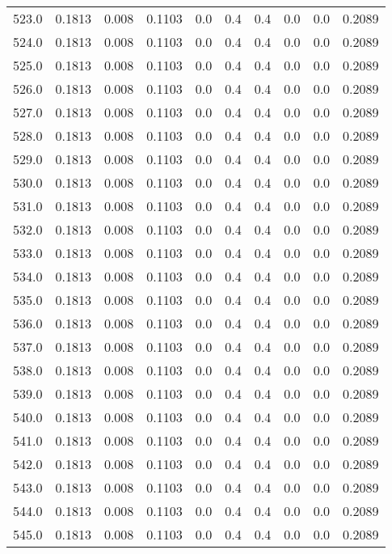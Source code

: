 \begin{longtable}{lrrrrrrrrr}
523.0 & 0.1813 & 0.008 & 0.1103 & 0.0 & 0.4 & 0.4 & 0.0 & 0.0 & 0.2089 \\
524.0 & 0.1813 & 0.008 & 0.1103 & 0.0 & 0.4 & 0.4 & 0.0 & 0.0 & 0.2089 \\
525.0 & 0.1813 & 0.008 & 0.1103 & 0.0 & 0.4 & 0.4 & 0.0 & 0.0 & 0.2089 \\
526.0 & 0.1813 & 0.008 & 0.1103 & 0.0 & 0.4 & 0.4 & 0.0 & 0.0 & 0.2089 \\
527.0 & 0.1813 & 0.008 & 0.1103 & 0.0 & 0.4 & 0.4 & 0.0 & 0.0 & 0.2089 \\
528.0 & 0.1813 & 0.008 & 0.1103 & 0.0 & 0.4 & 0.4 & 0.0 & 0.0 & 0.2089 \\
529.0 & 0.1813 & 0.008 & 0.1103 & 0.0 & 0.4 & 0.4 & 0.0 & 0.0 & 0.2089 \\
530.0 & 0.1813 & 0.008 & 0.1103 & 0.0 & 0.4 & 0.4 & 0.0 & 0.0 & 0.2089 \\
531.0 & 0.1813 & 0.008 & 0.1103 & 0.0 & 0.4 & 0.4 & 0.0 & 0.0 & 0.2089 \\
532.0 & 0.1813 & 0.008 & 0.1103 & 0.0 & 0.4 & 0.4 & 0.0 & 0.0 & 0.2089 \\
533.0 & 0.1813 & 0.008 & 0.1103 & 0.0 & 0.4 & 0.4 & 0.0 & 0.0 & 0.2089 \\
534.0 & 0.1813 & 0.008 & 0.1103 & 0.0 & 0.4 & 0.4 & 0.0 & 0.0 & 0.2089 \\
535.0 & 0.1813 & 0.008 & 0.1103 & 0.0 & 0.4 & 0.4 & 0.0 & 0.0 & 0.2089 \\
536.0 & 0.1813 & 0.008 & 0.1103 & 0.0 & 0.4 & 0.4 & 0.0 & 0.0 & 0.2089 \\
537.0 & 0.1813 & 0.008 & 0.1103 & 0.0 & 0.4 & 0.4 & 0.0 & 0.0 & 0.2089 \\
538.0 & 0.1813 & 0.008 & 0.1103 & 0.0 & 0.4 & 0.4 & 0.0 & 0.0 & 0.2089 \\
539.0 & 0.1813 & 0.008 & 0.1103 & 0.0 & 0.4 & 0.4 & 0.0 & 0.0 & 0.2089 \\
540.0 & 0.1813 & 0.008 & 0.1103 & 0.0 & 0.4 & 0.4 & 0.0 & 0.0 & 0.2089 \\
541.0 & 0.1813 & 0.008 & 0.1103 & 0.0 & 0.4 & 0.4 & 0.0 & 0.0 & 0.2089 \\
542.0 & 0.1813 & 0.008 & 0.1103 & 0.0 & 0.4 & 0.4 & 0.0 & 0.0 & 0.2089 \\
543.0 & 0.1813 & 0.008 & 0.1103 & 0.0 & 0.4 & 0.4 & 0.0 & 0.0 & 0.2089 \\
544.0 & 0.1813 & 0.008 & 0.1103 & 0.0 & 0.4 & 0.4 & 0.0 & 0.0 & 0.2089 \\
545.0 & 0.1813 & 0.008 & 0.1103 & 0.0 & 0.4 & 0.4 & 0.0 & 0.0 & 0.2089 \\

\end{longtable}
